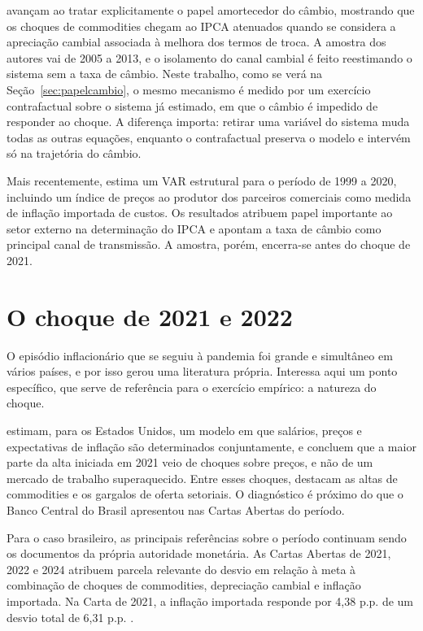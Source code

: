 \documentclass[12pt,openright,oneside,a4paper,portuguese,brazil]{abntex2}
\begin{document}
 avançam ao tratar explicitamente o papel amortecedor do
câmbio, mostrando que os choques de commodities chegam ao IPCA atenuados quando
se considera a apreciação cambial associada à melhora dos termos de troca. A
amostra dos autores vai de 2005 a 2013, e o isolamento do canal cambial é feito
reestimando o sistema sem a taxa de câmbio. Neste trabalho, como se verá na Seção~\ref{sec:papelcambio}, o mesmo mecanismo
é medido por um exercício contrafactual sobre o sistema já estimado, em que o
câmbio é impedido de responder ao choque. A diferença importa: retirar uma
variável do sistema muda todas as outras equações, enquanto o contrafactual
preserva o modelo e intervém só na trajetória do câmbio.

Mais recentemente,  estima um VAR estrutural para o
período de 1999 a 2020, incluindo um índice de preços ao produtor dos parceiros
comerciais como medida de inflação importada de custos. Os resultados atribuem
papel importante ao setor externo na determinação do IPCA e apontam a taxa de
câmbio como principal canal de transmissão. A amostra, porém, encerra-se antes
do choque de 2021.

\section{O choque de 2021 e 2022}
\label{sec:posspandemia}

O episódio inflacionário que se seguiu à pandemia foi grande e simultâneo em
vários países, e por isso gerou uma literatura própria. Interessa aqui um ponto
específico, que serve de referência para o exercício empírico: a natureza do
choque.

 estimam, para os Estados Unidos, um modelo em
que salários, preços e expectativas de inflação são determinados conjuntamente,
e concluem que a maior parte da alta iniciada em 2021 veio de choques sobre
preços, e não de um mercado de trabalho superaquecido. Entre esses choques,
destacam as altas de commodities e os gargalos de oferta setoriais. O
diagnóstico é próximo do que o Banco Central do Brasil apresentou nas Cartas
Abertas do período.

Para o caso brasileiro, as principais referências sobre o período continuam
sendo os documentos da própria autoridade monetária. As Cartas Abertas de 2021,
2022 e 2024 atribuem parcela relevante do desvio em relação à meta à combinação
de choques de commodities, depreciação cambial e inflação importada. Na Carta de
2021, a inflação importada responde por 4,38 p.p. de um desvio total de 6,31
p.p. \cite{bcb2022carta}.
\end{document}
